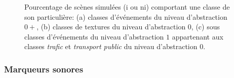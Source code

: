 \documentclass[twoside,twocolumn]{article}
\begin{document}
\begin{figure}[t]
        \myfloatalign
         \par
       \caption{Pourcentage de scènes simulées (i ou ni) comportant une classe de son particulière: (a) classes d'événements du niveau d'abstraction $0+$, (b) classes de textures du niveau d'abstraction $0$, (c) sous classes d'événements du niveau d'abstraction $1$ appartenant aux classes \emph{trafic} et \emph{transport public} du niveau d'abstraction $0$.}\label{fig:soundsource}
\end{figure}

\subsubsection*{Marqueurs sonores}
\end{document}
